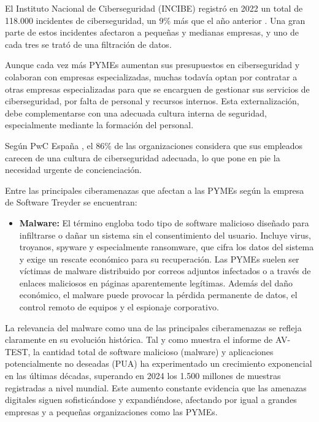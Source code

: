 \documentclass[a4paper, 11pt]{article}
\begin{document}
El Instituto Nacional de Ciberseguridad (INCIBE) registró en 2022 un total de 118.000 incidentes de ciberseguridad, un 9\% más que el año anterior \cite{incibe2023}. Una gran parte de estos incidentes afectaron a pequeñas y medianas empresas, y uno de cada tres se trató de una filtración de datos.
\par\vspace{0.5cm}

Aunque cada vez más PYMEs aumentan sus presupuestos en ciberseguridad y colaboran con empresas especializadas, muchas todavía optan por contratar a otras empresas especializadas para que se encarguen de gestionar sus servicios de ciberseguridad, 
por falta de personal y recursos internos. Esta 
externalización, debe complementarse con una adecuada cultura interna de seguridad, especialmente mediante la formación del personal.
\par\vspace{0.5cm}

Según PwC España \cite{pwc}, el 86\% de las organizaciones considera que sus empleados carecen de una cultura de ciberseguridad adecuada, lo que pone en pie la necesidad urgente de concienciación.
\par\vspace{0.5cm}

Entre las principales ciberamenazas que afectan a las PYMEs según la empresa de Software Treyder \cite{treyder} se encuentran:

\begin{itemize}
    \item \textbf{Malware:}  
    El término engloba todo tipo de software malicioso diseñado para infiltrarse o dañar un sistema sin el consentimiento del usuario. Incluye virus, troyanos, spyware y especialmente ransomware, que cifra los datos del sistema y exige un rescate económico para su recuperación. Las PYMEs suelen ser víctimas de malware distribuido por correos adjuntos infectados o a través de enlaces maliciosos en páginas aparentemente legítimas. Además del daño económico, el malware puede provocar la pérdida permanente de datos, el control remoto de equipos y el espionaje corporativo.
\end{itemize}

\vspace{0.5cm}

La relevancia del malware como una de las principales ciberamenazas se refleja claramente en su evolución histórica. Tal y como muestra el informe de AV-TEST, la cantidad total de software malicioso (malware) y aplicaciones potencialmente no deseadas (PUA) ha experimentado un crecimiento exponencial en las últimas décadas, superando en 2024 los 1.500 millones de muestras registradas a nivel mundial. Este aumento constante evidencia que las amenazas digitales siguen sofisticándose y expandiéndose, afectando por igual a grandes empresas y a pequeñas organizaciones como las PYMEs.
\end{document}
